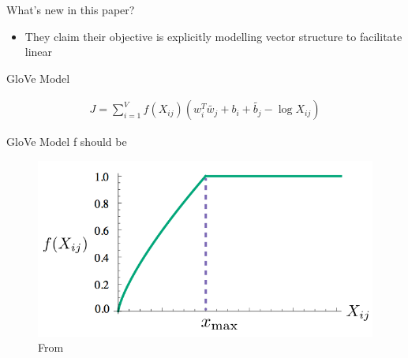 \begin{frame}{What's new in this paper?}
  \begin{itemize}
  \item They claim their objective is explicitly modelling vector structure to facilitate linear 
  \end{itemize}
\end{frame}

\begin{frame}{GloVe Model}

\begin{align*}
J = \sum_{i=1}^V f(X_{ij})(w_i^T\tilde{w_j} +b_i + \tilde{b_j} - \log X_{ij})
\end{align*}

\end{frame}

\begin{frame}{GloVe Model}
f should be
    \begin{figure}
      \includegraphics[scale=0.27]{images/weighting.png}
      \caption{From}
    \end{figure}
\end{frame}


